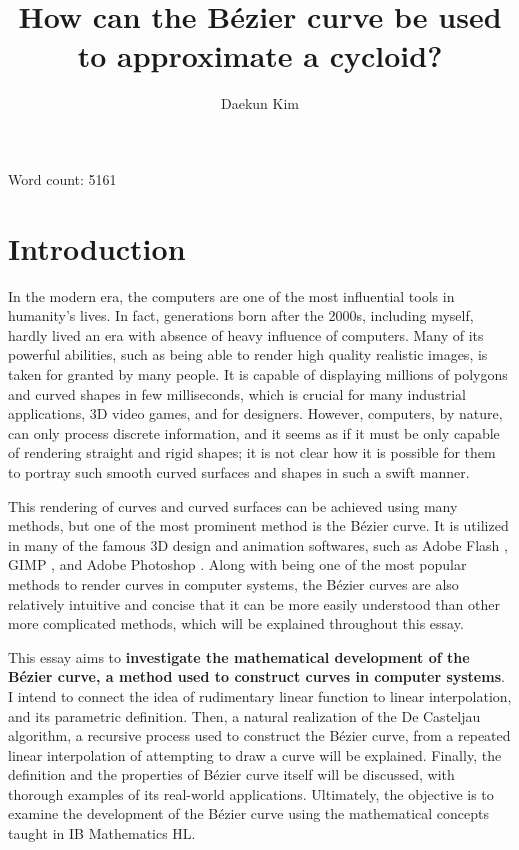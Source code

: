 \documentclass[11pt, oneside, appendixprefix=Appendix]{article}
\title{How can the B\'ezier curve be used to approximate a cycloid?}
\author{Daekun Kim}
\theoremstyle{definition}
\numberwithin{figure}{section}
\begin{document}
\begin{titlingpage}
\maketitle
Word count: 5161
\end{titlingpage}
\tableofcontents
\newpage

\section{Introduction}
	In the modern era, the computers are one of the most influential tools in humanity's lives. In fact, generations born after the 2000s, including myself, hardly lived an era with absence of heavy influence of computers. Many of its powerful abilities, such as being able to render high quality realistic images, is taken for granted by many people. It is capable of displaying millions of polygons and curved shapes in few milliseconds, which is crucial for many industrial applications, 3D video games, and for designers. However, computers, by nature, can only process discrete information, and it seems as if it must be only capable  of rendering straight and rigid shapes; it is not clear how it is possible for them to portray such smooth curved surfaces and shapes in such a swift manner.

This rendering of curves and curved surfaces can be achieved using many methods, but one of the most prominent method is the B\'ezier curve. It is utilized in many of the famous 3D design and animation softwares, such as Adobe Flash , GIMP , and Adobe Photoshop . Along with being one of the most popular methods to render curves in computer systems, the B\'ezier curves are also relatively intuitive and concise that it can be more easily understood than other more complicated methods, which will be explained throughout this essay.

This essay aims to \textbf{investigate the mathematical development of the B\'ezier curve, a method used to construct curves in computer systems}. I intend to connect the idea of rudimentary linear function to linear interpolation, and its parametric definition. Then, a natural realization of the De Casteljau algorithm, a recursive process used to construct the B\'ezier curve, from a repeated linear interpolation of attempting to draw a curve will be explained. Finally, the definition and the properties of B\'ezier curve itself will be discussed, with thorough examples of its real-world applications. Ultimately, the objective is to examine the development of the B\'ezier curve using the mathematical concepts taught in IB Mathematics HL.
\end{document}
